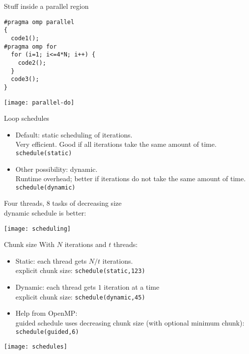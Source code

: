 \begin{frame}[containsverbatim]{Stuff inside a parallel region}
\footnotesize
\begin{multicols}{2}  
\begin{verbatim}
#pragma omp parallel
{
  code1();
#pragma omp for
  for (i=1; i<=4*N; i++) {
    code2();
  }
  code3();
}
\end{verbatim}
\columnbreak
\texttt{[image: parallel-do]}
\end{multicols}
\end{frame}

\begin{exerciseframe}[pi]
  \footnotesize
  
\end{exerciseframe}

\begin{frame}[containsverbatim]{Loop schedules}
  \begin{itemize}
  \item Default: static scheduling of iterations. \\
    Very efficient. Good if all iterations take the same amount of
    time.\\ \texttt{schedule(static)}
  \item Other possibility: dynamic.\\
    Runtime overhead; better if iterations do not take the same amount
    of time.\\
    \texttt{schedule(dynamic)}
  \end{itemize}

  Four threads, 8 tasks of decreasing size\\
  dynamic schedule is better:
  
  \texttt{[image: scheduling]}
\end{frame}

\begin{frame}[containsverbatim]{Chunk size}
\small
  With $N$ iterations and $t$ threads:
  \begin{itemize}
  \item Static: each thread gets $N/t$ iterations.\\
    explicit chunk size: \texttt{schedule(static,123)}
  \item Dynamic: each thread gets $1$ iteration at a time\\
    explicit chunk size: \texttt{schedule(dynamic,45)}\\
  \item Help from OpenMP:\\
    guided schedule uses decreasing chunk size (with optional minimum
    chunk):\\
    \texttt{schedule(guided,6)}
  \end{itemize}
  \texttt{[image: schedules]}
\end{frame}

